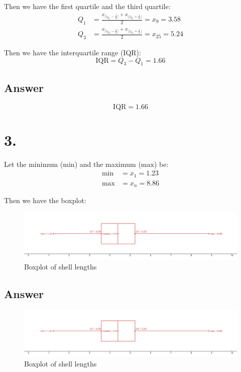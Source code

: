 \documentclass{article}
\begin{document}
Then we have the first quartile and the third quartile:
\[
\begin{aligned}
Q_1 &= \frac{x_{\lceil i_{Q_1} - \frac{1}{2} \rceil} + x_{\lfloor i_{Q_1} + \frac{1}{2} \rfloor}}{2} = x_9 = 3.58 \\
Q_3 &= \frac{x_{\lceil i_{Q_3} - \frac{1}{2} \rceil} + x_{\lfloor i_{Q_3} + \frac{1}{2} \rfloor}}{2} = x_{25} = 5.24
\end{aligned}
\]

Then we have the interquartile range (IQR):
\[
\mathrm{IQR} = Q_3 - Q_1 = 1.66
\]

\subsection*{Answer}

\[
\mathrm{IQR} = 1.66
\]

\section*{3.}

Let the minimum ($\mathrm{min}$) and the maximum ($\mathrm{max}$) be:
\[
\begin{aligned}
\mathrm{min} &= x_1 = 1.23 \\
\mathrm{max} &= x_n = 8.86
\end{aligned}
\]

Then we have the boxplot:

\begin{figure}[H]
    \centering
    \includegraphics[width=1\textwidth]{Q3-P3-boxplot.png}
    \caption{Boxplot of shell lengths}
    \label{fig:boxplot}
\end{figure}

\subsection*{Answer}

\begin{figure}[H]
    \centering
    \includegraphics[width=1\textwidth]{Q3-P3-boxplot.png}
    \caption{Boxplot of shell lengths}
    \label{fig:boxplot}
\end{figure}
\end{document}
